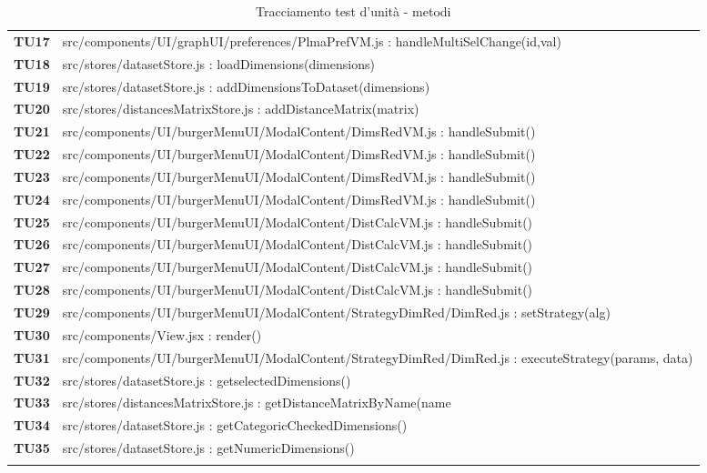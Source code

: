 {\begin{longtable}{C{1.1cm} | L{15cm}}
\textbf{TU17} & src/components/UI/graphUI/preferences/PlmaPrefVM.js : handleMultiSelChange(id,val)\\
\textbf{TU18} & src/stores/datasetStore.js : loadDimensions(dimensions)\\
\textbf{TU19} & src/stores/datasetStore.js : addDimensionsToDataset(dimensions)\\
\textbf{TU20} & src/stores/distancesMatrixStore.js : addDistanceMatrix(matrix)\\
\textbf{TU21} & src/components/UI/burgerMenuUI/ModalContent/DimsRedVM.js : handleSubmit()\\
\textbf{TU22} & src/components/UI/burgerMenuUI/ModalContent/DimsRedVM.js : handleSubmit()\\
\textbf{TU23} & src/components/UI/burgerMenuUI/ModalContent/DimsRedVM.js : handleSubmit()\\
\textbf{TU24} & src/components/UI/burgerMenuUI/ModalContent/DimsRedVM.js : handleSubmit()\\

\textbf{TU25} & src/components/UI/burgerMenuUI/ModalContent/DistCalcVM.js : handleSubmit()\\
\textbf{TU26} & src/components/UI/burgerMenuUI/ModalContent/DistCalcVM.js : handleSubmit()\\
\textbf{TU27} & src/components/UI/burgerMenuUI/ModalContent/DistCalcVM.js : handleSubmit()\\
\textbf{TU28} & src/components/UI/burgerMenuUI/ModalContent/DistCalcVM.js : handleSubmit()\\

\textbf{TU29} & src/components/UI/burgerMenuUI/ModalContent/StrategyDimRed/DimRed.js : setStrategy(alg)\\

\textbf{TU30} & src/components/View.jsx : render()\\

\textbf{TU31} & src/components/UI/burgerMenuUI/ModalContent/StrategyDimRed/DimRed.js : executeStrategy(params, data)\\ 

\textbf{TU32} & src/stores/datasetStore.js : getselectedDimensions()\\

\textbf{TU33} & src/stores/distancesMatrixStore.js : getDistanceMatrixByName(name\\

\textbf{TU34} & src/stores/datasetStore.js : getCategoricCheckedDimensions()\\

\textbf{TU35} & src/stores/datasetStore.js : getNumericDimensions()\\


		
		
		\caption{Tracciamento test d'unità - metodi}
\end{longtable}
}